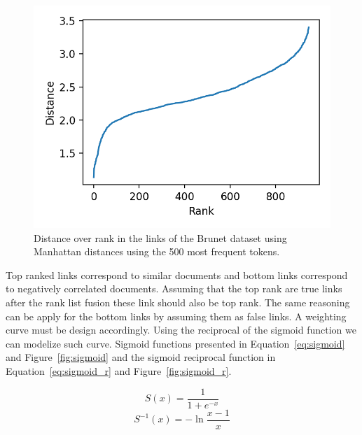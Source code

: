 \begin{figure}
  \includegraphics[width=\linewidth]{img/distance_over_rank.png}
  \caption{Distance over rank in the links of the Brunet dataset using Manhattan distances using the 500 most frequent tokens.}
  \label{fig:distance_over_rank}
\end{figure}

Top ranked links correspond to similar documents and bottom links correspond to negatively correlated documents.
Assuming that the top rank are true links after the rank list fusion these link should also be top rank.
The same reasoning can be apply for the bottom links by assuming them as false links.
A weighting curve must be design accordingly.
Using the reciprocal of the sigmoid function we can modelize such curve.
Sigmoid functions presented in Equation~\ref{eq:sigmoid} and Figure~\ref{fig:sigmoid} and the sigmoid reciprocal function in Equation~\ref{eq:sigmoid_r} and Figure~\ref{fig:sigmoid_r}.

\begin{equation}
  \label{eq:sigmoid}
  S(x) = \frac{1}{1+e^{-x}}
\end{equation}
\begin{equation}
  \label{eq:sigmoid_r}
  S^{-1}(x) = -\ln{\frac{x-1}{x}}
\end{equation}

